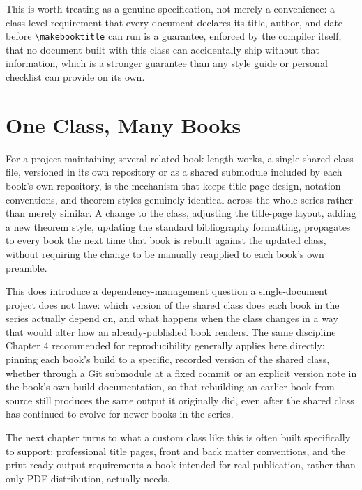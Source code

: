 This is worth treating as a genuine specification, not merely a convenience: a class-level requirement that every document declares its title, author, and date before \texttt{\textbackslash{}makebooktitle} can run is a guarantee, enforced by the compiler itself, that no document built with this class can accidentally ship without that information, which is a stronger guarantee than any style guide or personal checklist can provide on its own.

\hypertarget{one-class-many-books}{%
\section{One Class, Many Books}\label{one-class-many-books}}

For a project maintaining several related book-length works, a single shared class file, versioned in its own repository or as a shared submodule included by each book's own repository, is the mechanism that keeps title-page design, notation conventions, and theorem styles genuinely identical across the whole series rather than merely similar. A change to the class, adjusting the title-page layout, adding a new theorem style, updating the standard bibliography formatting, propagates to every book the next time that book is rebuilt against the updated class, without requiring the change to be manually reapplied to each book's own preamble.

This does introduce a dependency-management question a single-document project does not have: which version of the shared class does each book in the series actually depend on, and what happens when the class changes in a way that would alter how an already-published book renders. The same discipline Chapter 4 recommended for reproducibility generally applies here directly: pinning each book's build to a specific, recorded version of the shared class, whether through a Git submodule at a fixed commit or an explicit version note in the book's own build documentation, so that rebuilding an earlier book from source still produces the same output it originally did, even after the shared class has continued to evolve for newer books in the series.

The next chapter turns to what a custom class like this is often built specifically to support: professional title pages, front and back matter conventions, and the print-ready output requirements a book intended for real publication, rather than only PDF distribution, actually needs.
